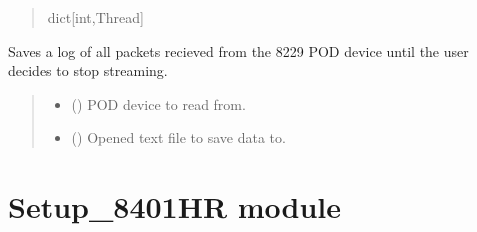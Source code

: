 \documentclass[letterpaper,10pt,english]{sphinxmanual}
\begin{document}
\begin{fulllineitems}
\begin{fulllineitems}
\begin{quote}
\begin{description}
\sphinxAtStartPar
dict{[}int,Thread{]}

\end{description}\end{quote}

\end{fulllineitems}


\begin{fulllineitems}
\label{\detokenize{Setup_8229:Setup_8229.Setup_8229._StreamUntilStop}}
\pysigstartsignatures
{}
\pysigstopsignatures
\sphinxAtStartPar
Saves a log of all packets recieved from the 8229 POD device until the user decides         to stop streaming.
\begin{quote}\begin{description}
\begin{itemize}
\item {} 
\sphinxAtStartPar
{} ({\hyperref[\detokenize{PodDevice_8229:PodDevice_8229.POD_8229}]{}}) \textendash{} POD device to read from.

\item {} 
\sphinxAtStartPar
{} () \textendash{} Opened text file to save data to.

\end{itemize}

\end{description}\end{quote}

\end{fulllineitems}


\end{fulllineitems}


\sphinxstepscope


\section{Setup\_8401HR module}
\label{\detokenize{Setup_8401HR:module-Setup_8401HR}}\label{\detokenize{Setup_8401HR:setup-8401hr-module}}\label{\detokenize{Setup_8401HR::doc}}
\end{document}
